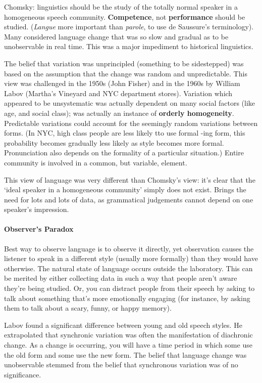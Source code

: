\documentclass{exam}
\begin{document}
Chomsky: linguistics should be the study of the totally normal speaker in a homogeneous speech community. \textbf{Competence}, not \textbf{performance} should be studied. (\textit{Langue} more important than \textit{parole}, to use de Saussure's terminology). Many considered language change that was so slow and gradual as to be unobservable in real time. This was a major impediment to historical linguistics. 

The belief that variation was unprincipled (something to be sidestepped) was based on the assumption that the change was random and unpredictable. This view was challenged in the 1950s (John Fisher) and in the 1960s by William Labov (Martha's Vineyard and NYC department stores). Variation which appeared to be unsystematic was actually dependent on many social factors (like age, and social class); was actually an instance of \textbf{orderly homogeneity}. Predictable variations could account for the seemingly random variations between forms. (In NYC, high class people are less likely tto use formal -ing form, this probability becomes gradually less likely as style becomes more formal. Pronunciation also depends on the formality of a particular situation.) Entire community is involved in a common, but variable, element. 

This view of language was very different than Chomsky's view: it's clear that the  `ideal speaker in a homogeneous community' simply does not exist. Brings the need for lots and lots of data, as grammatical judgements cannot depend on one speaker's impression. 

\paragraph{Observer's Paradox} Best way to observe language is to observe it directly, yet observation causes the listener to speak in a different style (usually more formally) than they would have otherwise. The natural state of language occurs outside the laboratory. This can be merited by either collecting data in such a way that people aren't aware they're being studied. Or, you can distract people from their speech by asking to talk about something that's more emotionally engaging (for instance, by asking them to talk about a scary, funny, or happy memory). 

Labov found a significant difference between young and old speech styles. He extrapolated that synchronic variation was often the manifestation of diachronic change. As a change is occurring, you will have a time period in which some use the old form and some use the new form. The belief that language change was unobservable stemmed from the belief that synchronous variation was of no significance.
\end{document}
